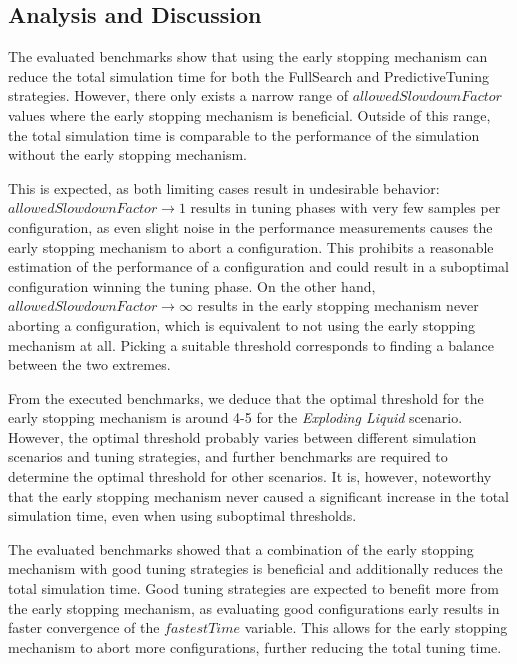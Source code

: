 \documentclass[conference]{IEEEtran}
\begin{document}
\subsection{Analysis and Discussion}
\begin{description}[leftmargin=1.2em, font=\itshape]
    \item[Optimal Thresholds:]
        The evaluated benchmarks show that using the early stopping mechanism can reduce the total simulation time for both the FullSearch and PredictiveTuning strategies. However, there only exists a narrow range of $allowedSlowdownFactor$ values where the early stopping mechanism is beneficial. Outside of this range, the total simulation time is comparable to the performance of the simulation without the early stopping mechanism.

        This is expected, as both limiting cases result in undesirable behavior: $allowedSlowdownFactor \to 1$ results in tuning phases with very few samples per configuration, as even slight noise in the performance measurements causes the early stopping mechanism to abort a configuration. This prohibits a reasonable estimation of the performance of a configuration and could result in a suboptimal configuration winning the tuning phase. On the other hand, $allowedSlowdownFactor \to \infty$ results in the early stopping mechanism never aborting a configuration, which is equivalent to not using the early stopping mechanism at all. Picking a suitable threshold corresponds to finding a balance between the two extremes.

        From the executed benchmarks, we deduce that the optimal threshold for the early stopping mechanism is around 4-5 for the \textit{Exploding Liquid} scenario. However, the optimal threshold probably varies between different simulation scenarios and tuning strategies, and further benchmarks are required to determine the optimal threshold for other scenarios. It is, however, noteworthy that the early stopping mechanism never caused a significant increase in the total simulation time, even when using suboptimal thresholds.

    \item[Combination with Tuning Strategies:]
        The evaluated benchmarks showed that a combination of the early stopping mechanism with good tuning strategies is beneficial and additionally reduces the total simulation time. Good tuning strategies are expected to benefit more from the early stopping mechanism, as evaluating good configurations early results in faster convergence of the $fastestTime$ variable. This allows for the early stopping mechanism to abort more configurations, further reducing the total tuning time.


\end{description}
\end{document}
